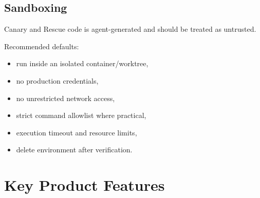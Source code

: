 \documentclass[12pt]{article}
\begin{document}
\subsection{Sandboxing}

Canary and Rescue code is agent-generated and should be treated as untrusted.

Recommended defaults:

\begin{itemize}
    \item run inside an isolated container/worktree,
    \item no production credentials,
    \item no unrestricted network access,
    \item strict command allowlist where practical,
    \item execution timeout and resource limits,
    \item delete environment after verification.
\end{itemize}

\section{Key Product Features}
\end{document}
